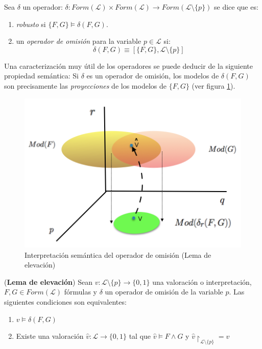  Sea $\delta$ un operador: $\delta :Form(\mathcal{L}) \times Form(\mathcal{L}) \longrightarrow Form(\mathcal{L} \setminus \{ p \})$  se dice que es:

\begin{enumerate}
\item \textit{robusto} si $\{F,G\} \vDash \delta (F,G)$.
\item un \textit{operador de omisión} para la variable $p \in \mathcal{L}$ si:
$$\delta (F,G) \equiv [\{F,G\}, \mathcal{L} \setminus \{p\}]$$
\end{enumerate} 

Una caracterización muy útil de los operadores se puede deducir de la siguiente propiedad semántica: Si  $\delta$ es un operador de omisión, los modelos de $\delta (F,G)$ son precisamente las \textit{proyecciones} de los modelos de $\{ F,G \}$ (ver figura \ref{fig:proy}). 

\vspace{0.5cm}
\begin{figure}[h]
	\centering
		\includegraphics[scale=0.6]{imagenes/indemod.png}
	\caption{Interpretación semántica del operador de omisión (Lema de elevación)}
	\label{fig:proy}
\end{figure}
\vspace{0.5cm}

\lem \label{lem:lifting} (\textbf{Lema de elevación}) Sean $v :\mathcal{L} \setminus \{p\} \rightarrow \{ 0,1 \}$ una valoración o interpretación, $F, G \in Form(\mathcal{L})$ fórmulas y $\delta$ un operador de omisión de la variable $p$. Las siguientes condiciones son equivalentes:
\begin{enumerate}
\item $v \vDash \delta (F,G)$
\item Existe una valoración $\hat{v} : \mathcal{L} \rightarrow \{ 0,1 \}$ tal que $\hat{v} \vDash F \wedge G$ y $\hat{v} \upharpoonright_{\mathcal{L} \setminus \{ p \}} = v $
\end{enumerate}

